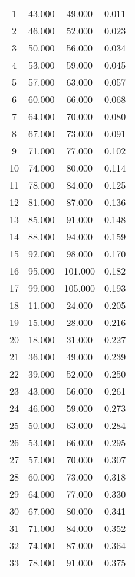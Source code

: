 % 
\begin{tabular}{cccc}
  \hline
  \hline
1 & 43.000 & 49.000 & 0.011 \\ 
  2 & 46.000 & 52.000 & 0.023 \\ 
  3 & 50.000 & 56.000 & 0.034 \\ 
  4 & 53.000 & 59.000 & 0.045 \\ 
  5 & 57.000 & 63.000 & 0.057 \\ 
  6 & 60.000 & 66.000 & 0.068 \\ 
  7 & 64.000 & 70.000 & 0.080 \\ 
  8 & 67.000 & 73.000 & 0.091 \\ 
  9 & 71.000 & 77.000 & 0.102 \\ 
  10 & 74.000 & 80.000 & 0.114 \\ 
  11 & 78.000 & 84.000 & 0.125 \\ 
  12 & 81.000 & 87.000 & 0.136 \\ 
  13 & 85.000 & 91.000 & 0.148 \\ 
  14 & 88.000 & 94.000 & 0.159 \\ 
  15 & 92.000 & 98.000 & 0.170 \\ 
  16 & 95.000 & 101.000 & 0.182 \\ 
  17 & 99.000 & 105.000 & 0.193 \\ 
  18 & 11.000 & 24.000 & 0.205 \\ 
  19 & 15.000 & 28.000 & 0.216 \\ 
  20 & 18.000 & 31.000 & 0.227 \\ 
  21 & 36.000 & 49.000 & 0.239 \\ 
  22 & 39.000 & 52.000 & 0.250 \\ 
  23 & 43.000 & 56.000 & 0.261 \\ 
  24 & 46.000 & 59.000 & 0.273 \\ 
  25 & 50.000 & 63.000 & 0.284 \\ 
  26 & 53.000 & 66.000 & 0.295 \\ 
  27 & 57.000 & 70.000 & 0.307 \\ 
  28 & 60.000 & 73.000 & 0.318 \\ 
  29 & 64.000 & 77.000 & 0.330 \\ 
  30 & 67.000 & 80.000 & 0.341 \\ 
  31 & 71.000 & 84.000 & 0.352 \\ 
  32 & 74.000 & 87.000 & 0.364 \\ 
  33 & 78.000 & 91.000 & 0.375 \\ 

\end{tabular}
